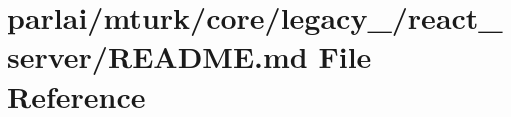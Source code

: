 \hypertarget{parlai_2mturk_2core_2legacy__2018_2react__server_2README_8md}{}\section{parlai/mturk/core/legacy\+\_/react\+\_\+server/\+R\+E\+A\+D\+ME.md File Reference}
\label{parlai_2mturk_2core_2legacy__2018_2react__server_2README_8md}
